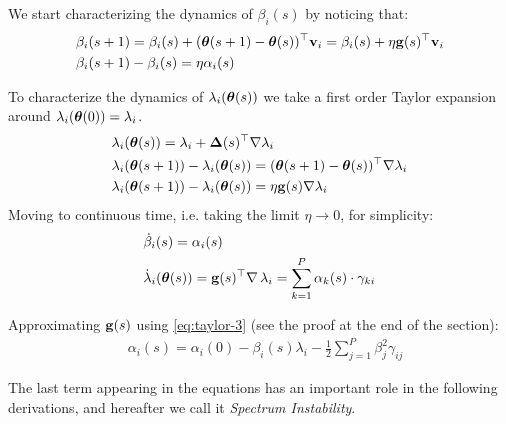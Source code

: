 \documentclass{article} %
\begin{document}
We start characterizing the dynamics of $\beta_i(s)$ by noticing that: 
\begin{align}
    &\beta_i(s+1) = \beta_i(s) + (\mbox{$\mbox{$\boldsymbol{\theta}$}$}(s+1) - \mbox{$\mbox{$\boldsymbol{\theta}$}$}(s))^\top \mbox{$\mbox{$\mathbf{v}$}$}_i = \beta_i(s) + \eta\mbox{$\mbox{$\mathbf{g}$}$}(s)^\top\mbox{$\mbox{$\mathbf{v}$}$}_i\\
    & \beta_i(s+1) - \beta_i(s) = \eta\alpha_i(s) 
\end{align}

To characterize the dynamics of $\lambda_i(\mbox{$\mbox{$\boldsymbol{\theta}$}$}(s))$ we take a first order Taylor expansion around $\lambda_i(\mbox{$\mbox{$\boldsymbol{\theta}$}$}(0)) = \lambda_i$. 
\begin{align}
    &\lambda_i(\mbox{$\mbox{$\boldsymbol{\theta}$}$}(s)) = \lambda_i + \mbox{$\mbox{$\boldsymbol{\Delta}$}$}(s)^\top\nabla\lambda_i\\
    &\lambda_i(\mbox{$\mbox{$\boldsymbol{\theta}$}$}(s+1)) - \lambda_i(\mbox{$\mbox{$\boldsymbol{\theta}$}$}(s))  =  (\mbox{$\mbox{$\boldsymbol{\theta}$}$}(s+1) - \mbox{$\mbox{$\boldsymbol{\theta}$}$}(s))^\top\nabla\lambda_i\\ 
    & \lambda_i(\mbox{$\mbox{$\boldsymbol{\theta}$}$}(s+1)) - \lambda_i(\mbox{$\mbox{$\boldsymbol{\theta}$}$}(s))  =  \eta \mbox{$\mbox{$\mathbf{g}$}$}(s) \nabla\lambda_i 
\end{align}
Moving to continuous time, i.e. taking the limit $\eta \to 0$, for simplicity: 
\begin{align}
    \label{eq:beta-dynamics-implicit}
    & \dot\beta_i(s) = \alpha_i(s) \\
    \label{eq:lambda-dynamics-implicit}
    &\dot\lambda_i(\mbox{$\mbox{$\boldsymbol{\theta}$}$}(s)) = \mbox{$\mbox{$\mathbf{g}$}$}(s)^\top\nabla\,\lambda_i = \sum_{k=1}^P \alpha_k(s)\cdot \gamma_{ki}
\end{align}

Approximating $\mbox{$\mbox{$\mathbf{g}$}$}(s)$ using \cref{eq:taylor-3} (see the proof at the end of the section):
\begin{align}
\label{eq:alpha-dynamics}
    &\alpha_i(s) = \alpha_i(0) -  \beta_i(s) \lambda_i   - \frac{1}{2}\sum_{j=1}^P \beta_j^2\gamma_{ij}
\end{align}

The last term appearing in the equations has an important role in the following derivations, and hereafter we call it \emph{Spectrum Instability}. 
\end{document}
